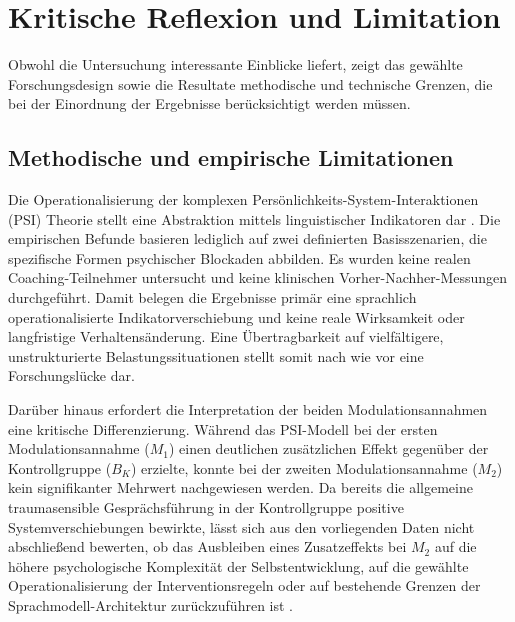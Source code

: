 \section{Kritische Reflexion und Limitation}
Obwohl die Untersuchung interessante Einblicke liefert, zeigt das gewählte Forschungsdesign sowie die Resultate methodische und technische Grenzen, die bei der Einordnung der Ergebnisse berücksichtigt werden müssen.

\subsection{Methodische und empirische Limitationen}
Die Operationalisierung der komplexen Persönlichkeits-System-Interaktionen (PSI) Theorie stellt eine Abstraktion mittels 
linguistischer Indikatoren dar \citep{kuhl2005neue}.
Die 
empirischen Befunde basieren lediglich auf zwei definierten Basisszenarien, die spezifische Formen psychischer 
Blockaden abbilden. Es wurden keine realen Coaching-Teilnehmer untersucht und keine klinischen 
Vorher-Nachher-Messungen durchgeführt. Damit belegen die Ergebnisse primär eine 
sprachlich operationalisierte Indikatorverschiebung und keine reale 
Wirksamkeit oder langfristige Verhaltensänderung. Eine Übertragbarkeit auf vielfältigere, 
unstrukturierte Belastungssituationen stellt somit nach wie vor eine Forschungslücke dar.

Darüber hinaus erfordert die Interpretation der beiden Modulationsannahmen eine 
kritische Differenzierung. Während das PSI-Modell bei der ersten Modulationsannahme 
($M_1$) einen deutlichen zusätzlichen Effekt gegenüber der Kontrollgruppe ($B_K$) 
erzielte, konnte bei der zweiten Modulationsannahme ($M_2$) kein signifikanter Mehrwert 
nachgewiesen werden. Da bereits die allgemeine traumasensible Gesprächsführung in der 
Kontrollgruppe positive Systemverschiebungen bewirkte, lässt sich aus den vorliegenden 
Daten nicht abschließend bewerten, ob das Ausbleiben eines Zusatzeffekts bei $M_2$ 
auf die höhere psychologische Komplexität der Selbstentwicklung, auf die gewählte 
Operationalisierung der Interventionsregeln oder auf bestehende Grenzen der 
Sprachmodell-Architektur zurückzuführen ist \citep{cohen1988statistical}. 


